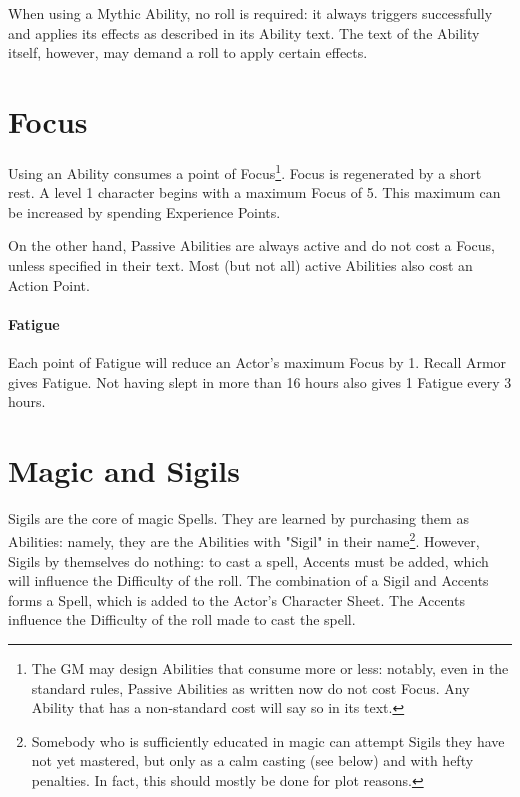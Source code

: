 When using a Mythic Ability, no roll is required: it always triggers successfully and applies its effects as described in its Ability text. The text of the Ability itself, however, may demand a roll to apply certain effects.


\section{Focus}
\label{resources}

Using an Ability consumes a point of Focus\footnote{The GM may design Abilities that consume more or less: notably, even in the standard rules, Passive Abilities as written now do not cost Focus. Any Ability that has a non-standard cost will say so in its text.}. Focus is regenerated by a short rest. A level 1 character begins with a maximum Focus of 5. This maximum can be increased by spending Experience Points. 

On the other hand, Passive Abilities are always active and do not cost a Focus, unless specified in their text. Most (but not all) active Abilities also cost an Action Point.

\paragraph{Fatigue}

Each point of Fatigue will reduce an Actor's maximum Focus by 1. Recall Armor gives Fatigue. Not having slept in more than 16 hours also gives 1 Fatigue every 3 hours.


\section{Magic and Sigils}
\label{spells}


Sigils are the core of magic Spells. They are learned by purchasing them as Abilities: namely, they are the Abilities with "Sigil" in their name\footnote{Somebody who is sufficiently educated in magic can attempt Sigils they have not yet mastered, but only as a calm casting (see below) and with hefty penalties. In fact, this should mostly be done for plot reasons.}. However, Sigils by themselves do nothing: to cast a spell, Accents must be added, which will influence the Difficulty of the roll. The combination of a Sigil and Accents forms a Spell, which is added to the Actor's Character Sheet. The Accents influence the Difficulty of the roll made to cast the spell.

